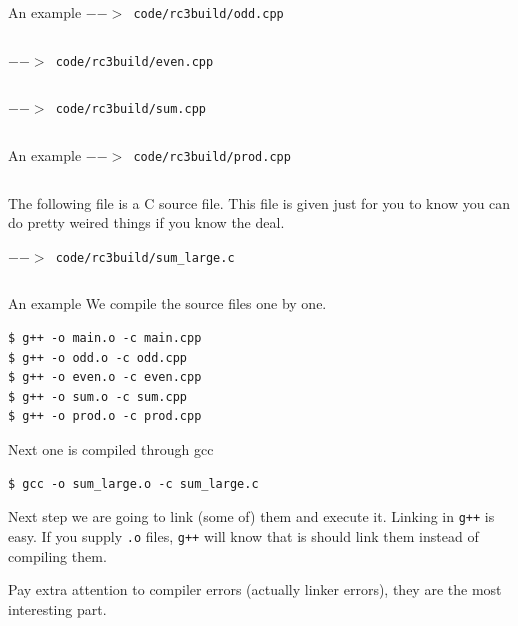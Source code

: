 \begin{frame}[fragile]{An example}
\label{example:dec_def}
\vspace{0.04in}
\texttt{$-->$ code/rc3build/odd.cpp}
\inputminted{c++}{code/rc3build/odd.cpp}

\vspace{0.04in}
\texttt{$-->$ code/rc3build/even.cpp}
\inputminted{c++}{code/rc3build/even.cpp}

\vspace{0.04in}
\texttt{$-->$ code/rc3build/sum.cpp}
\inputminted{c++}{code/rc3build/sum.cpp}
\end{frame}

\begin{frame}[fragile]{An example}
\texttt{$-->$ code/rc3build/prod.cpp}
\inputminted{c++}{code/rc3build/prod.cpp}

\vspace{0.04in}
\begin{small}
	The following file is a C source file. This file is given just for you to know you can do pretty weired things if you know the deal.
\end{small}

\texttt{$-->$ code/rc3build/sum\_large.c}
\inputminted{c++}{code/rc3build/sum_large.c}

\end{frame}

\begin{frame}[fragile]{An example}
We compile the source files one by one. 
\begin{verbatim}
$ g++ -o main.o -c main.cpp
$ g++ -o odd.o -c odd.cpp
$ g++ -o even.o -c even.cpp
$ g++ -o sum.o -c sum.cpp
$ g++ -o prod.o -c prod.cpp
\end{verbatim}
Next one is compiled through gcc
\begin{verbatim}
$ gcc -o sum_large.o -c sum_large.c
\end{verbatim}

Next step we are going to link (some of) them and execute it. Linking in \texttt{g++} is easy. If you supply \texttt{.o} files, \texttt{g++} will know that is should link them instead of compiling them.

Pay extra attention to compiler errors (actually linker errors), they are the most interesting part.

\end{frame}

